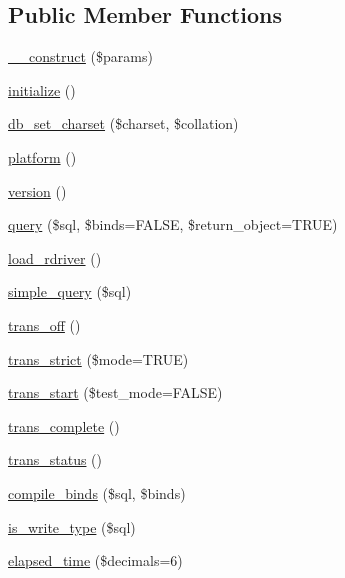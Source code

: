 \subsection*{Public Member Functions}
\begin{DoxyCompactItemize}
\item 
\hyperlink{class_c_i___d_b__driver_a9162320adff1a1a4afd7f2372f753a3e}{\-\_\-\-\_\-construct} (\$params)
\item 
\hyperlink{class_c_i___d_b__driver_a91098fa7d1917ce4833f284bbef12627}{initialize} ()
\item 
\hyperlink{class_c_i___d_b__driver_adc8cd12121dc8edda3adcadd88a97e24}{db\-\_\-set\-\_\-charset} (\$charset, \$collation)
\item 
\hyperlink{class_c_i___d_b__driver_ad69bddb2ba31b27415484b3da4213ba8}{platform} ()
\item 
\hyperlink{class_c_i___d_b__driver_a6080dae0886626b9a4cedb29240708b1}{version} ()
\item 
\hyperlink{class_c_i___d_b__driver_af987e82e6283e31a44db93d51558710d}{query} (\$sql, \$binds=F\-A\-L\-S\-E, \$return\-\_\-object=T\-R\-U\-E)
\item 
\hyperlink{class_c_i___d_b__driver_a0bd509a0088f09f4bbfbcbbe78bc3547}{load\-\_\-rdriver} ()
\item 
\hyperlink{class_c_i___d_b__driver_a6ac4d82d7ba4e8df07e1367229084c91}{simple\-\_\-query} (\$sql)
\item 
\hyperlink{class_c_i___d_b__driver_ae9080ca6b0a9a258f5e87750b266e337}{trans\-\_\-off} ()
\item 
\hyperlink{class_c_i___d_b__driver_a648f8e6b3d0c53ce2afd63cfcea1fe74}{trans\-\_\-strict} (\$mode=T\-R\-U\-E)
\item 
\hyperlink{class_c_i___d_b__driver_ab082d21c9a77398c6d6705d9e978fb20}{trans\-\_\-start} (\$test\-\_\-mode=F\-A\-L\-S\-E)
\item 
\hyperlink{class_c_i___d_b__driver_aa0edd209de428801ce5faa1fe740852e}{trans\-\_\-complete} ()
\item 
\hyperlink{class_c_i___d_b__driver_a7ce49452153f13afde8f9c5212028be6}{trans\-\_\-status} ()
\item 
\hyperlink{class_c_i___d_b__driver_a0ba381d2e9078472bd0167e75cc8033c}{compile\-\_\-binds} (\$sql, \$binds)
\item 
\hyperlink{class_c_i___d_b__driver_af435df5703c238769d6d16fde6d51182}{is\-\_\-write\-\_\-type} (\$sql)
\item 
\hyperlink{class_c_i___d_b__driver_a7bcec8d3f7d72453deb78e296815711a}{elapsed\-\_\-time} (\$decimals=6)

\end{DoxyCompactItemize}
